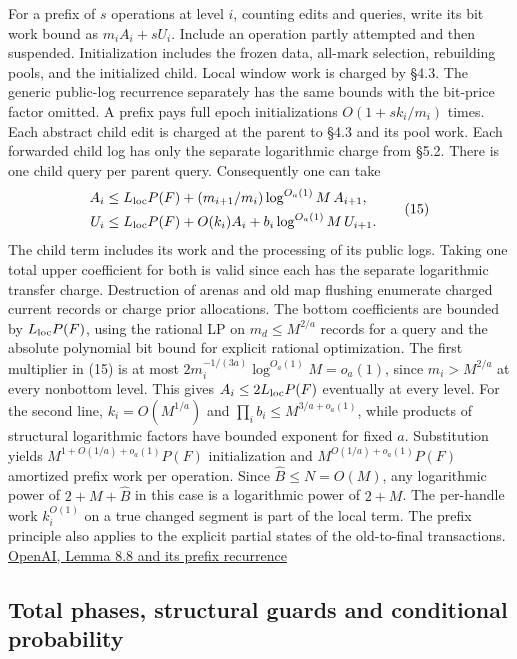 \documentclass[11pt]{article}
\begin{document}
For a prefix of \(s\) operations at level \(i\), counting edits and queries, write its bit work bound as \(m_i A_i+s U_i\). Include an operation partly attempted and then suspended. Initialization includes the frozen data, all-mark selection, rebuilding pools, and the initialized child. Local window work is charged by §4.3. The generic public-log recurrence separately has the same bounds with the bit-price factor omitted. A prefix pays full epoch initializations \(O(1+s k_i/m_i)\) times. Each abstract child edit is charged at the parent to §4.3 and its pool work. Each forwarded child log has only the separate logarithmic charge from §5.2. There is one child query per parent query. Consequently one can take
\[
\begin{aligned}
 A_i&\le L_{\rm loc} P(F)+(m_{i+1}/m_i)\log^{O_a(1)}M\,A_{i+1},\\
 U_i&\le L_{\rm loc} P(F)+O(k_i)A_i+b_i\log^{O_a(1)}M\,U_{i+1}.
\end{aligned}
\tag{15}
\]
The child term includes its work and the processing of its public logs. Taking one total upper coefficient for both is valid since each has the separate logarithmic transfer charge. Destruction of arenas and old map flushing enumerate charged current records or charge prior allocations. The bottom coefficients are bounded by \(L_{\rm loc}P(F)\), using the rational LP on \(m_d\le M^{2/a}\) records for a query and the absolute polynomial bit bound for explicit rational optimization. The first multiplier in (15) is at most \(2m_i^{-1/(3a)}\log^{O_a(1)}M=o_a(1)\), since \(m_i>M^{2/a}\) at every nonbottom level. This gives \(A_i\le2L_{\rm loc}P(F)\) eventually at every level. For the second line, \(k_i=O(M^{1/a})\) and \(\prod_i b_i\le M^{3/a+o_a(1)}\), while products of structural logarithmic factors have bounded exponent for fixed \(a\). Substitution yields \(M^{1+O(1/a)+o_a(1)}P(F)\) initialization and \(M^{O(1/a)+o_a(1)}P(F)\) amortized prefix work per operation. Since \(\widehat B\le N=O(M)\), any logarithmic power of \(2+M+\widehat B\) in this case is a logarithmic power of \(2+M\). The per-handle work \(k_i^{O(1)}\) on a true changed segment is part of the local term. The prefix principle also applies to the explicit partial states of the old-to-final transactions. \href{https://raw.githubusercontent.com/openai/math/adc7f1241b42e322a6451854ab7e4b4c146bf78a/preprints/Almost-Linear-Time-Maximum-Cardinality-Matching-in-Sparse-General-Graphs-September-24-2026/main.pdf\#page=73}{OpenAI, Lemma 8.8 and its prefix recurrence}

\hypertarget{total-phases-structural-guards-and-conditional-probability}{%
\subsection{Total phases, structural guards and conditional probability}\label{total-phases-structural-guards-and-conditional-probability}}
\end{document}
